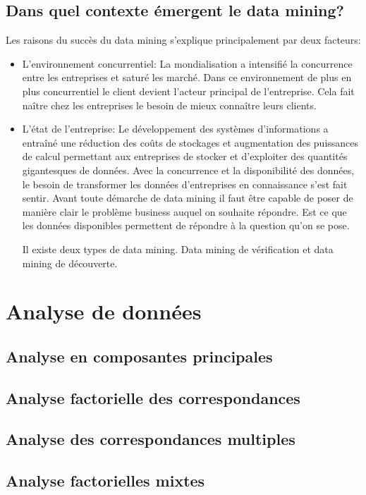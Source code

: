 \documentclass{article}\usepackage[]{graphicx}\usepackage[]{color}
\begin{document}
\subsection{Dans quel contexte émergent le data mining?}
Les raisons du succès du data mining s'explique principalement par deux facteurs:
\begin{itemize}
\item L'environnement concurrentiel: La mondialisation a intensifié la concurrence entre les entreprises et saturé les marché. Dans ce environnement de plus en plus concurrentiel le client devient l'acteur principal de l'entreprise. Cela fait naître chez les entreprises le besoin de mieux connaître leurs clients.
\item L'état de l'entreprise: Le développement des systèmes d'informations a entraîné une réduction des coûts de stockages et augmentation des puissances de calcul permettant aux entreprises de stocker et d'exploiter des quantités gigantesques de données.
Avec la concurrence et la disponibilité des données, le besoin de transformer les données d'entreprises en connaissance s'est fait sentir.
Avant toute démarche de data mining il faut être capable de poser de manière clair le problème business auquel on souhaite répondre. Est ce que les données disponibles permettent de répondre à la question qu'on se pose.

Il existe deux types de data mining.
Data mining de vérification et data mining de découverte.
\end{itemize}

\section{Analyse de données}
\subsection{Analyse en composantes principales}

\subsection{Analyse factorielle des correspondances}

\subsection{Analyse des correspondances multiples}


\subsection{Analyse factorielles mixtes}
\end{document}
